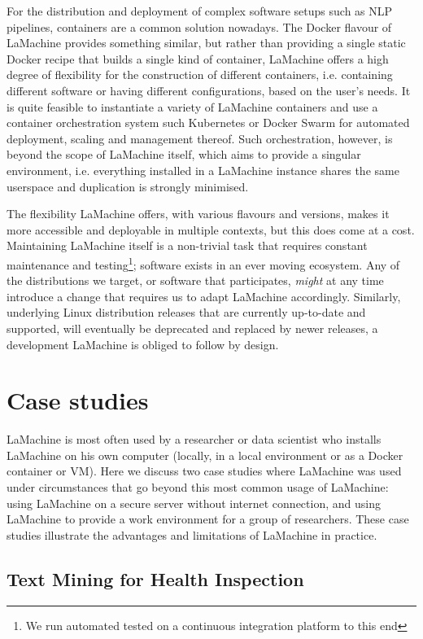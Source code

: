 \documentclass[a4paper,11pt]{article}
\begin{document}
For the distribution and deployment of complex software setups such as NLP pipelines, containers are a common solution
nowadays. The Docker flavour of LaMachine provides something similar, but rather than providing a single static Docker recipe
that builds a single kind of container, LaMachine offers a high degree of flexibility for the construction of different
containers, i.e. containing different software or having different configurations, based on the user's needs. It is
quite feasible to instantiate a variety of LaMachine containers and use a container orchestration system such
Kubernetes or Docker Swarm for automated deployment, scaling and management thereof. Such orchestration, however, is
beyond the scope of LaMachine itself, which aims to provide a singular environment, i.e. everything installed in a
LaMachine instance shares the same userspace and duplication is strongly minimised.

The flexibility LaMachine offers, with various flavours and versions, makes it more accessible and deployable in
multiple contexts, but this does come at a cost. Maintaining LaMachine itself is a non-trivial task that requires
constant maintenance and testing\footnote{We run automated tested on a continuous integration platform to this end};
software exists in an ever moving ecosystem. Any of the distributions we target, or software that participates, \emph{might}
at any time introduce a change that requires us to adapt LaMachine accordingly. Similarly, underlying Linux
distribution releases that are currently up-to-date and supported, will eventually be deprecated and replaced by newer releases, a development
LaMachine is obliged to follow by design.


\section{Case studies}\label{sec:case}

LaMachine is most often used by a researcher or data scientist who installs LaMachine on his own computer (locally, in a
local environment or as a Docker container or VM). Here we discuss two case studies where LaMachine was used under
circumstances that go beyond this most common usage of LaMachine: using LaMachine on a secure server without internet
connection, and using LaMachine to provide a work environment for a group of researchers. These case studies illustrate
the advantages and limitations of LaMachine in practice.

\subsection{Text Mining for Health Inspection}
\end{document}
